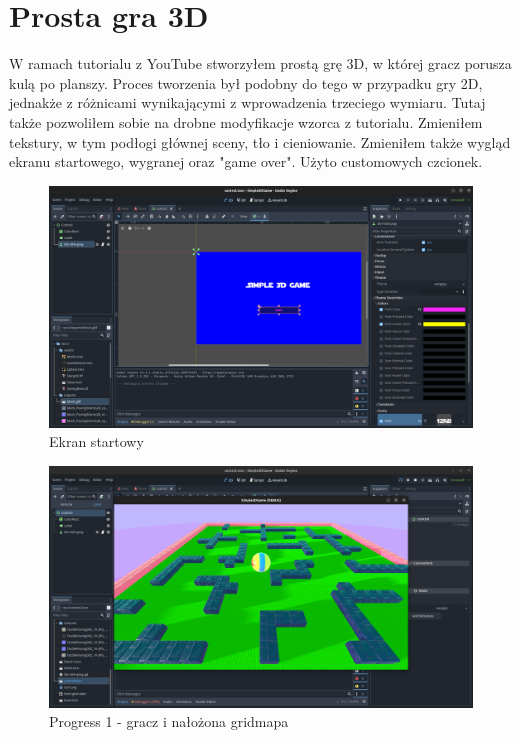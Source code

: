 \documentclass[a4paper]{article}
\begin{document}
\begin{sloppypar}
	\section[htb]{Prosta gra 3D}
	W ramach tutorialu z YouTube stworzyłem prostą grę 3D, w której gracz porusza kulą po planszy. Proces tworzenia był podobny
	do tego w przypadku gry 2D, jednakże z różnicami wynikającymi z wprowadzenia trzeciego wymiaru.
	Tutaj także pozwoliłem sobie na drobne modyfikacje wzorca z tutorialu. Zmieniłem tekstury, w tym podłogi głównej sceny, tło i cieniowanie.
	Zmieniłem także wygląd ekranu startowego, wygranej oraz "game over". Użyto customowych czcionek.
	\begin{center}
		\begin{figure}[htb]
			\centering
			\includegraphics[width=1\textwidth]{3d/start-screen.png}
			\caption{Ekran startowy}
		\end{figure}
		\begin{figure}[htb]
			\centering
			\includegraphics[width=1\textwidth]{3d/progress1.png}
			\caption{Progress 1 - gracz i nałożona gridmapa}
		\end{figure}

\end{center}
\end{sloppypar}
\end{document}
